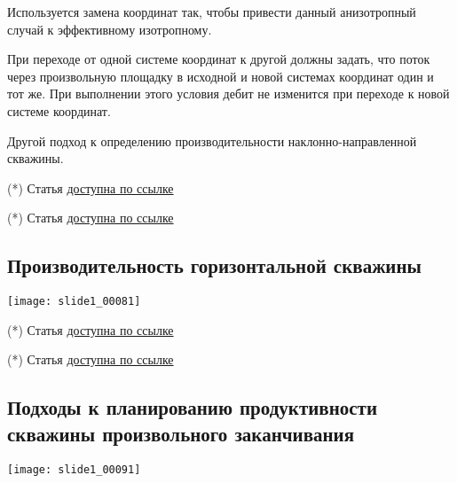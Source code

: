 \documentclass[main.tex]{subfiles}
\begin{document}
Используется замена координат так, чтобы привести данный анизотропный случай к эффективному изотропному.

При переходе от одной системе координат к другой должны задать, что поток через произвольную площадку в исходной и новой системах координат один и тот же. При выполнении этого условия дебит не изменится при переходе к новой системе координат.





Другой подход к определению производительности наклонно-направленной скважины.

(*) Статья \href{https://mualal.github.io/source/tex/hydrocarbons2022/articles/ozkan2000.pdf}{доступна по ссылке}


(*) Статья \href{https://mualal.github.io/source/tex/hydrocarbons2022/articles/besson1990.pdf}{доступна по ссылке}

\subsection{Производительность горизонтальной скважины}

\texttt{[image: slide1\_00081]}

(*) Статья \href{https://mualal.github.io/source/tex/hydrocarbons2022/articles/joshi1988.pdf}{доступна по ссылке}


(*) Статья \href{https://mualal.github.io/source/tex/hydrocarbons2022/articles/joshi1988.pdf}{доступна по ссылке}








\subsection{Подходы к планированию продуктивности скважины произвольного заканчивания}

\texttt{[image: slide1\_00091]}
\end{document}
